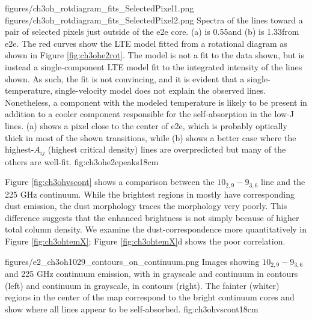 \documentclass{emulateapj}
\begin{document}
\FigureTwo
{figures/ch3oh_rotdiagram_fits_SelectedPixel1.png}
{figures/ch3oh_rotdiagram_fits_SelectedPixel2.png}
{Spectra of the \methanol lines toward a pair of selected pixels just outside
of the e2e core. (a) is 0.55\arcsec  and (b) is 1.33\arcsec from e2e.  The red
curves show the LTE model fitted from a rotational diagram as shown in Figure
\ref{fig:ch3ohe2rot}.  The model is not a fit to the data shown, but is instead
a single-component LTE model fit to the integrated intensity of the lines
shown.  As such, the fit is not convincing, and it is evident that a
single-temperature, single-velocity model does not explain the observed lines.
Nonetheless, a component with the modeled temperature is likely to be present
in addition to a cooler component responsible for the self-absorption in the
low-J lines.  (a) shows a pixel close to the center of e2e, which is probably
optically thick in most of the shown transitions, while (b) shows a better case
where the highest-$A_{ij}$ (highest critical density) lines are overpredicted
but many of the others are well-fit.}
{fig:ch3ohe2epeaks}{1}{8cm}

Figure \ref{fig:ch3ohvscont} shows a comparison between the \methanol
$10_{2,9}-9_{3,6}$ line and the 225 GHz continuum.  While the brightest regions
in \methanol mostly have corresponding dust emission, the dust morphology
traces the \methanol morphology very poorly.  This difference suggests that the
enhanced brightness is not simply because of higher total column density.
We examine the dust-\methanol correspondence more quantitatively in Figure
\ref{fig:ch3ohtemX}; Figure \ref{fig:ch3ohtemX}d shows the poor correlation.

          {figures/e2_ch3oh1029_contours_on_continuum.png}
{Images showing \methanol $10_{2,9}-9_{3,6}$ and 225 GHz continuum emission,
with \methanol in grayscale and continuum in contours (left) and continuum in
grayscale, \methanol in contours (right).  The fainter (whiter) regions in the center
of the \methanol map correspond to the bright continuum cores and show where all lines
appear to be self-absorbed.}
{fig:ch3ohvscont}{1}{8cm}
\end{document}

